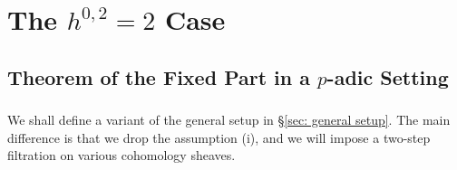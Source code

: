 \documentclass[letter, 11pt]{article}
\theoremstyle{plain}
\theoremstyle{definition}
\newcommand{\IC}{\mathbb{C}}
\newcommand{\IN}{\mathbb{N}}
\newcommand{\IQ}{\mathbb{Q}}
\newcommand{\IV}{\mathbb{V}}
\newcommand{\<}{\langle}
\renewcommand{\>}{\rangle}
\newcommand{\sH}{\mathcal{H}}
\newcommand{\sX}{\mathcal{X}}
\newcommand{\sS}{\mathcal{S}}
\newcommand{\sO}{\mathcal{O}}
\newcommand{\dR}{\mathrm{dR}}
\newcommand{\et}{\textrm{{\'e}t}}
\newcommand{\bxi}{\boldsymbol{\xi}}
\begin{document}
\section{The $h^{0, 2} = 2$ Case}
\subsection{Theorem of the Fixed Part in a $p$-adic Setting}

\subsubsection{}\label{sec: setup 2} We shall define a variant of the general setup in \S\ref{sec: general setup}. The main difference is that we drop the assumption (i), and we will impose a two-step filtration on various cohomology sheaves. 

\end{document}
